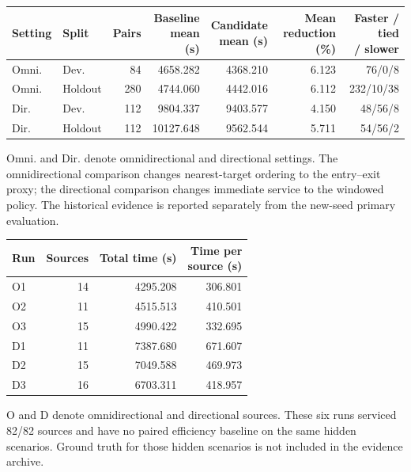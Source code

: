 \documentclass[11pt,letterpaper]{article}
\begin{document}
\begin{center}\begin{minipage}{\linewidth}\small
{}
\label{tab:s5}
\begin{tabular*}{\linewidth}{@{\extracolsep{\fill}}llrrrrr@{}}
\toprule
Setting & Split & Pairs & \shortstack[l]{Baseline\\mean (s)} & \shortstack[l]{Candidate\\mean (s)} & \shortstack[l]{Mean reduction\\(\%)} & \shortstack[l]{Faster / tied\\/ slower} \\
\midrule
Omni. & Dev. & 84 & 4658.282 & 4368.210 & 6.123 & 76/0/8 \\
Omni. & Holdout & 280 & 4744.060 & 4442.016 & 6.112 & 232/10/38 \\
Dir. & Dev. & 112 & 9804.337 & 9403.577 & 4.150 & 48/56/8 \\
Dir. & Holdout & 112 & 10127.648 & 9562.544 & 5.711 & 54/56/2 \\
\bottomrule
\end{tabular*}
\end{minipage}\end{center}
Omni. and Dir. denote omnidirectional and directional settings. The omnidirectional comparison changes nearest-target ordering to the entry--exit proxy; the directional comparison changes immediate service to the windowed policy. The historical evidence is reported separately from the new-seed primary evaluation.


\begin{center}\begin{minipage}{\linewidth}\small
{}
\label{tab:s6}
\begin{tabular*}{\linewidth}{@{\extracolsep{\fill}}lrrr@{}}
\toprule
Run & Sources & Total time (s) & \shortstack[l]{Time per\\source (s)} \\
\midrule
O1 & 14 & 4295.208 & 306.801 \\
O2 & 11 & 4515.513 & 410.501 \\
O3 & 15 & 4990.422 & 332.695 \\
D1 & 11 & 7387.680 & 671.607 \\
D2 & 15 & 7049.588 & 469.973 \\
D3 & 16 & 6703.311 & 418.957 \\
\bottomrule
\end{tabular*}
\end{minipage}\end{center}
O and D denote omnidirectional and directional sources. These six runs serviced 82/82 sources and have no paired efficiency baseline on the same hidden scenarios. Ground truth for those hidden scenarios is not included in the evidence archive.
\end{document}
